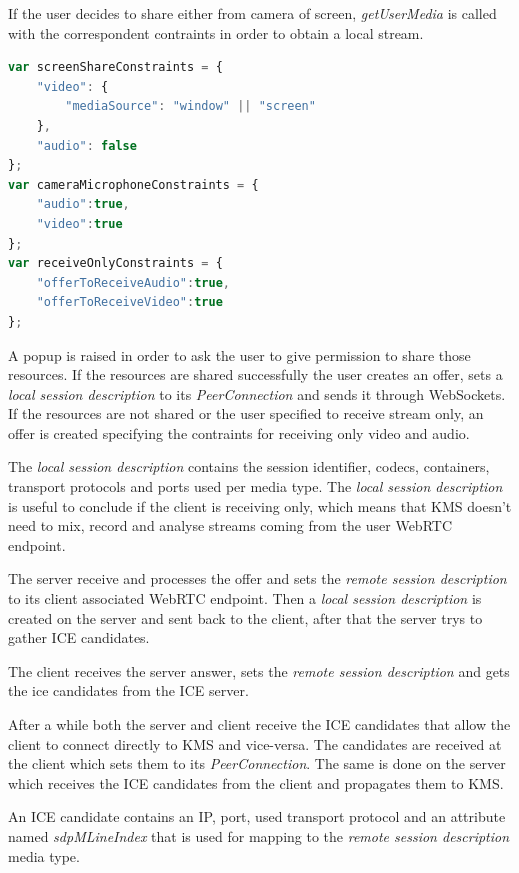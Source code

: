 If the user decides to share either from camera of screen, \emph{getUserMedia} is called with the correspondent contraints in order to obtain a local stream. 

\begin{lstlisting}[caption={Media constraints},language=JavaScript]
var screenShareConstraints = {	
	"video": {
		"mediaSource": "window" || "screen"
	}, 
	"audio": false
};
var cameraMicrophoneConstraints = {
	"audio":true, 
	"video":true 
};
var receiveOnlyConstraints = {
	"offerToReceiveAudio":true,
	"offerToReceiveVideo":true
};
\end{lstlisting}

A popup is raised in order to ask the user to give permission to share those resources. If the resources are shared successfully the user creates an offer, sets a \emph{local session description} to its \emph{PeerConnection} and sends it through WebSockets. If the resources are not shared or the user specified to receive stream only, an offer is created specifying the contraints for receiving only video and audio.

The \emph{local session description} contains the session identifier, codecs, containers, transport protocols and ports used per media type. The \emph{local session description} is useful to conclude if the client is receiving only, which means that \ac{KMS} doesn't need to mix, record and analyse streams coming from the user \ac{WebRTC} endpoint. 

The server receive and processes the offer and sets the \emph{remote session description} to its client associated \ac{WebRTC} endpoint. Then a \emph{local session description} is created on the server and sent back to the client, after that the server trys to gather \ac{ICE} candidates.

The client receives the server answer, sets the \emph{remote session description} and gets the ice candidates from the \ac{ICE} server. 

After a while both the server and client receive the \ac{ICE} candidates that allow the client to connect directly to \ac{KMS} and vice-versa. The candidates are received at the client which sets them to its \emph{PeerConnection}. The same is done on the server which receives the \ac{ICE} candidates from the client and propagates them to \ac{KMS}.

An \ac{ICE} candidate contains an \ac{IP}, port, used transport protocol and an attribute named \emph{sdpMLineIndex} that is used for mapping to the \emph{remote session description} media type.

